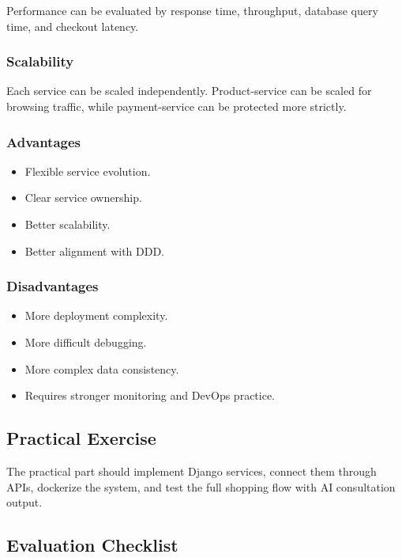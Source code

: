 \documentclass[12pt,a4paper]{article}
\begin{document}
Performance can be evaluated by response time, throughput, database query time, and checkout latency.

\subsubsection{Scalability}

Each service can be scaled independently. Product-service can be scaled for browsing traffic, while payment-service can be protected more strictly.

\subsubsection{Advantages}

\begin{itemize}
    \item Flexible service evolution.
    \item Clear service ownership.
    \item Better scalability.
    \item Better alignment with DDD.
\end{itemize}

\subsubsection{Disadvantages}

\begin{itemize}
    \item More deployment complexity.
    \item More difficult debugging.
    \item More complex data consistency.
    \item Requires stronger monitoring and DevOps practice.
\end{itemize}

\subsection{Practical Exercise}

The practical part should implement Django services, connect them through APIs, dockerize the system, and test the full shopping flow with AI consultation output.

\subsection{Evaluation Checklist}
\end{document}
